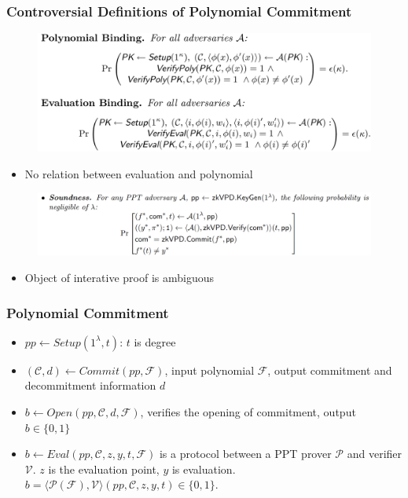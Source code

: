\documentclass[UFT8]{beamer}
\begin{document}
\begin{frame}
	\frametitle{Controversial Definitions of Polynomial Commitment}
	\begin{figure}
		\includegraphics[scale=0.35]{assets/kzg-pcs.png}
	\end{figure}
	\begin{itemize}
		\item No relation between evaluation and polynomial 
	\end{itemize}
	\begin{figure}
		\includegraphics[scale=0.32]{assets/virgo-pcs.png}
	\end{figure}
	\begin{itemize}
		\item Object of interative proof is ambiguous
	\end{itemize}
\end{frame}

\begin{frame}
	\frametitle{Polynomial Commitment}

	\begin{definition}
	\begin{itemize}
		\item $pp \leftarrow Setup(1^{\lambda}, t)$: $t$ is degree
		\item $(\mathcal{C}, d) \leftarrow Commit(pp, \mathcal{F})$, input polynomial $\mathcal{F}$, output commitment and decommitment information $d$
		\item $b \leftarrow Open(pp, \mathcal{C}, d, \mathcal{F})$, verifies the opening of commitment, output $b \in \{0, 1\}$
		\item $b \leftarrow Eval(pp, \mathcal{C}, z, y, t, \mathcal{F})$ is a protocol between a PPT prover $\mathcal{P}$ and verifier $\mathcal{V}$. $z$ is the evaluation point, $y$ is evaluation. $b = \langle \mathcal{P}(\mathcal{F}), \mathcal{V} \rangle(pp, \mathcal{C}, z, y, t) \in \{0, 1\}$.
	\end{itemize}
	\end{definition}
\end{frame}
\end{document}
